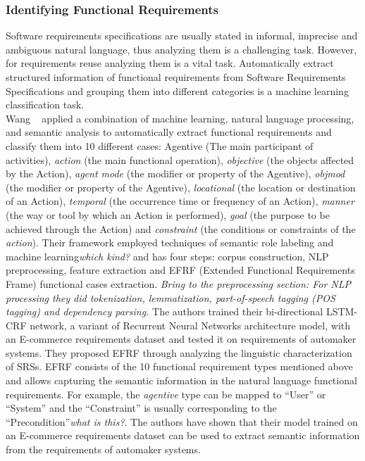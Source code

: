 \subsubsection{Identifying Functional Requirements}

Software requirements specifications are usually stated in informal, imprecise
and ambiguous natural language, thus analyzing them is a challenging task.
However, for requirements reuse analyzing them is a vital task. Automatically extract structured information of
functional requirements from Software Requirements Specifications and grouping
them into different categories is a machine learning classification
task\cite{7949577}. \\

Wang \etal~\cite{7949577} applied a combination of machine learning, natural
language processing, and semantic analysis to automatically extract functional
requirements and classify them into 10 different cases: Agentive (The main
participant of activities), \emph{action} (the main functional operation),
 \emph{objective} (the objects affected by the Action), \emph{agent mode} (the
 modifier or property of the Agentive), \emph{objmod} (the modifier or property
 of the Agentive), \emph{locational} (the location or
 destination of an Action), \emph{temporal} (the occurrence time or frequency of
 an Action), \emph{manner} (the way or tool by which an Action is performed),
 \emph{goal} (the purpose to be achieved through the Action) and
 \emph{constraint} (the conditions or constraints of the  \emph{action}). Their
 framework employed techniques of semantic role labeling and
 machine learning\emph{which kind?} and has four steps: corpus construction, NLP
 preprocessing, feature extraction and EFRF (Extended Functional Requirements
 Frame) functional cases extraction.
 \emph{Bring to the preprocessing section: For NLP processing they did
 tokenization, lemmatization, part-of-speech tagging (POS tagging) and
 dependency parsing.} The authors trained their bi-directional LSTM-CRF network,
 a variant of Recurrent Neural Networks architecture model, with an E-commerce
 requirements dataset and tested it on requirements of automaker systems. They
 proposed EFRF through analyzing the linguistic characterization of
 SRSs. EFRF consists of the 10 functional requirement types mentioned
 above and allows capturing the semantic information in the natural language
 functional requirements. For example, the \emph{agentive} type can be mapped
 to “User” or “System” and the “Constraint” is usually corresponding to the
 “Precondition”\emph{what is this?}. The authors have shown that their
 model trained on an E-commerce requirements dataset can be used to extract
 semantic information from the requirements of automaker systems.


